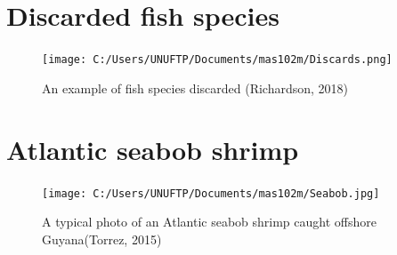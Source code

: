 \documentclass[
]{book}
\begin{document}
\hypertarget{discarded-fish-species}{%
\section{Discarded fish species}\label{discarded-fish-species}}

\begin{figure}
\centering
\texttt{[image: C:/Users/UNUFTP/Documents/mas102m/Discards.png]}
\caption{An example of fish species discarded (Richardson, 2018)}
\end{figure}

\hypertarget{atlantic-seabob-shrimp}{%
\section{Atlantic seabob shrimp}\label{atlantic-seabob-shrimp}}

\begin{figure}
\centering
\texttt{[image: C:/Users/UNUFTP/Documents/mas102m/Seabob.jpg]}
\caption{A typical photo of an Atlantic seabob shrimp caught offshore Guyana(Torrez, 2015)}
\end{figure}

  
\end{document}

